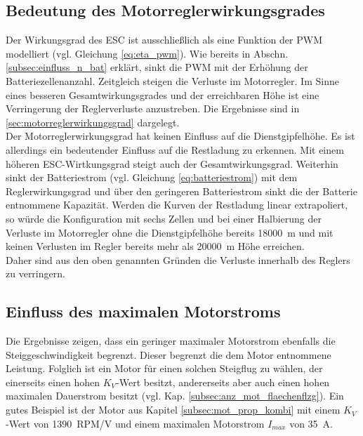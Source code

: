\subsection{Bedeutung des Motorreglerwirkungsgrades}
\label{subsec:einfluss_eta_pwm}
Der Wirkungsgrad des ESC ist ausschließlich als eine Funktion der PWM modelliert (vgl. Gleichung \ref{eq:eta_pwm}). Wie bereits in Abschn. \ref{subsec:einfluss_n_bat} erklärt, sinkt die PWM mit der Erhöhung der Batteriezellenanzahl. Zeitgleich steigen die Verluste im Motorregler. Im Sinne eines besseren Gesamtwirkungsgrades und der erreichbaren Höhe ist eine Verringerung der Reglerverluste anzustreben. Die Ergebnisse sind in \ref{sec:motorreglerwirkungsgrad} dargelegt. \\
Der Motorreglerwirkungsgrad hat keinen Einfluss auf die Dienstgipfelhöhe. Es ist allerdings ein bedeutender Einfluss auf die Restladung zu erkennen. Mit einem höheren ESC-Wirtkungsgrad steigt auch der Gesamtwirkungsgrad. Weiterhin sinkt der Batteriestrom (vgl. Gleichung \ref{eq:batteriestrom}) mit dem Reglerwirkungsgrad und über den geringeren Batteriestrom sinkt die der Batterie entnommene Kapazität. Werden die Kurven der Restladung linear extrapoliert, so würde die Konfiguration mit sechs Zellen und bei einer Halbierung der Verluste im Motorregler ohne die Dienstgipfelhöhe bereits \SI{18000}{m} und mit keinen Verlusten im Regler bereits mehr als \SI{20000}{m} Höhe erreichen. \\
Daher sind aus den oben genannten Gründen die Verluste innerhalb des Reglers zu verringern. 


\subsection{Einfluss des maximalen Motorstroms}
Die Ergebnisse zeigen, dass ein geringer maximaler Motorstrom ebenfalls die Steiggeschwindigkeit begrenzt. Dieser begrenzt die dem Motor entnommene Leistung. 
Folglich ist ein Motor für einen solchen Steigflug zu wählen, der einerseits einen hohen \ensuremath{K_V}-Wert besitzt, andererseits aber auch einen hohen maximalen Dauerstrom besitzt (vgl. Kap. \ref{subsec:anz_mot_flaechenflzg}). Ein gutes Beispiel ist der Motor aus Kapitel \ref{subsec:mot_prop_kombi} mit einem \ensuremath{K_V}-Wert von \SI{1390}{RPM/V} und einem maximalen Motorstrom \ensuremath{I_{max}} von \SI{35}{A}.




